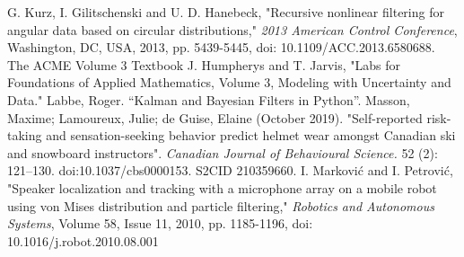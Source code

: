 \documentclass[11pt]{amsart}
\begin{document}
\begin{thebibliography}{99}
 G. Kurz, I. Gilitschenski and U. D. Hanebeck, "Recursive nonlinear filtering for angular data based on circular distributions," \textit{2013 American Control Conference}, Washington, DC, USA, 2013, pp. 5439-5445, doi: 10.1109/ACC.2013.6580688.
 The ACME Volume 3 Textbook
 J. Humpherys and T. Jarvis, "Labs for Foundations of Applied Mathematics, Volume 3, Modeling with Uncertainty and Data."
 Labbe, Roger. “Kalman and Bayesian Filters in Python”.
 Masson, Maxime; Lamoureux, Julie; de Guise, Elaine (October 2019). "Self-reported risk-taking and sensation-seeking behavior predict helmet wear amongst Canadian ski and snowboard instructors". \textit{Canadian Journal of Behavioural Science.} 52 (2): 121–130. doi:10.1037/cbs0000153. S2CID 210359660.
 I. Marković and I. Petrović, "Speaker localization and tracking with a microphone array on a mobile robot using von Mises distribution and particle filtering," \textit{Robotics and Autonomous Systems}, Volume 58, Issue 11, 2010, pp. 1185-1196, doi: 10.1016/j.robot.2010.08.001
\end{thebibliography}
\end{document}
